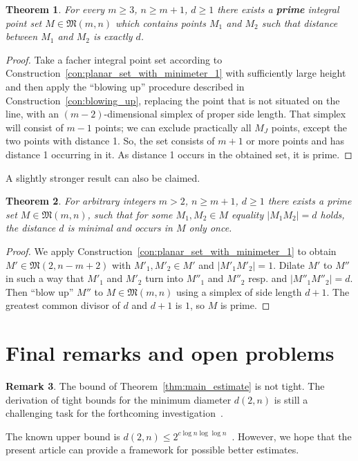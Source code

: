 \documentclass[a4paper,14pt]{article} %
\theoremstyle{plain}
\newtheorem{theorem}{Theorem}[section]
\theoremstyle{definition}
\newtheorem{remark}[theorem]{Remark}
\begin{document}
\begin{theorem}
	\label{thm:prime_with_desired_distance}
	For every $m \geq 3$, $n \geq m+1$, $d \geq 1$ there exists a \textbf{prime}
	integral point set $M\in\mathfrak{M}(m,n)$ which
	contains points $M_1$ and $M_2$ such that distance between $M_1$ and $M_2$ is exactly $d$.
\end{theorem}

\begin{proof}
	Take a facher integral point set according to Construction~\ref{con:planar_set_with_minimeter_1}
	with sufficiently large height and then apply the ``blowing up'' procedure described in Construction~\ref{con:blowing_up},
	replacing the point that is not situated on the line, with an $(m-2)$-dimensional simplex of proper side length.
	That simplex will consist of $m-1$ points;
	we can exclude practically all $M_J$ points, except the two points with distance 1.
	So, the set consists of $m+1$ or more points and has distance 1 occurring in it.
	As distance 1 occurs in the obtained set, it is prime.
\end{proof}

A slightly stronger result can also be claimed.

\begin{theorem}
	\label{thm:prime_with_unique_desired_distance}
	For arbitrary integers $m > 2$, $n \geq m+1$, $d \geq 1$
	there exists a prime set $M\in\mathfrak{M}(m,n)$,
	such that for some $M_1, M_2\in M$ equality $|M_1 M_2| = d$ holds,
	the distance $d$ is minimal and occurs in $M$ only once.
\end{theorem}

\begin{proof}
	We apply Construction~\ref{con:planar_set_with_minimeter_1} to obtain $M'\in \mathfrak{M}(2,n-m+2)$
	with $M'_1, M'_2 \in M'$ and $|M'_1 M'_2| = 1$.
	Dilate $M'$ to $M''$ in such a way that $M'_1$ and $M'_2$ turn into $M''_1$ and $M''_2$ resp.
	and $|M''_1 M''_2| = d$.
	Then ``blow up'' $M''$ to $M\in \mathfrak{M}(m,n)$ using a simplex of side length $d+1$.
	The greatest common divisor of $d$ and $d+1$ is $1$, so $M$ is prime.
\end{proof}


\section{Final remarks and open problems}

\begin{remark}
	The bound of Theorem~\ref{thm:main_estimate} is not tight.
	The derivation of tight bounds for the minimum diameter $d(2, n)$
	is still a challenging task for the forthcoming investigation~\cite[Section 7]{kurz2008minimum}.
\end{remark}
The known upper bound is $d(2,n)\leq 2^{c \log n \log \log n}$~\cite{harborth1993upper}.
However, we hope that the present article can provide a framework for possible better estimates.
\end{document}
